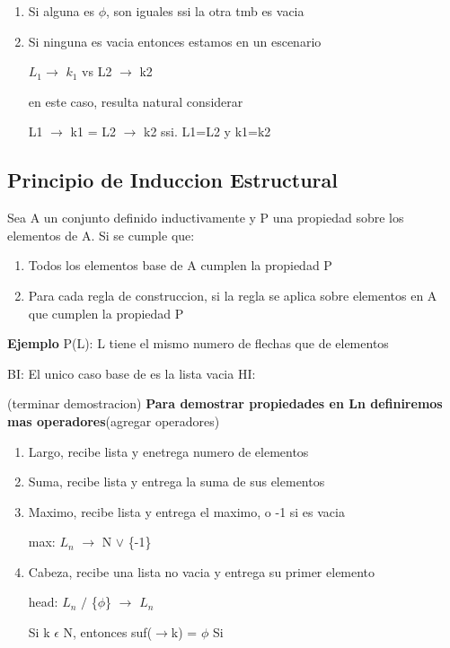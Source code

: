 \documentclass{article}
\begin{document}
            \begin{enumerate}
                \item Si alguna es $\phi$, son iguales ssi la otra tmb es vacia
                \item Si ninguna es vacia entonces estamos en un escenario 
                \begin{center}
                    $L_{1}$$\rightarrow$ $k_{1}$ vs L2 $\rightarrow$ k2
                \end{center}
                en este caso, resulta natural considerar 
                \begin{center}
                    L1 $\rightarrow$ k1 = L2 $\rightarrow$ k2 ssi. L1=L2 y k1=k2
                \end{center}
            \end{enumerate}
        \subsection{Principio de Induccion Estructural}
        Sea A un conjunto definido inductivamente y P una propiedad sobre los elementos de A.
        Si se cumple que:
        \begin{enumerate}
            \item Todos los elementos base de A cumplen la propiedad P
            \item Para cada regla de construccion, si la regla se aplica sobre elementos
            en A que cumplen la propiedad P 
        \end{enumerate}
        \textbf{Ejemplo}
        P(L): L tiene el mismo numero de flechas que de elementos
        \begin{center}
            BI: El unico caso base de es la lista vacia
            \newline
            HI:
        \end{center}(terminar demostracion)
        \newline
        \textbf{Para demostrar propiedades en Ln definiremos mas operadores}(agregar operadores)
        \begin{enumerate}
            \item Largo, recibe lista y enetrega numero de elementos
            \item Suma, recibe lista y entrega la suma de sus elementos
            \item Maximo, recibe lista y entrega el maximo, o -1 si es vacia \begin{center}
                max: $L_{n}$ $\rightarrow$ N $\vee$ \{-1\}
            \end{center}
            \item Cabeza, recibe una lista no vacia y entrega su primer elemento \begin{center}
                head: $L_{n}$ $/$ \{$\phi$\} $\rightarrow$ $L_{n}$ 
            \end{center}
            Si k $\epsilon$ N, entonces suf($\rightarrow$k) = $\phi$ \newline
            Si 
        \end{enumerate}
\end{document}
